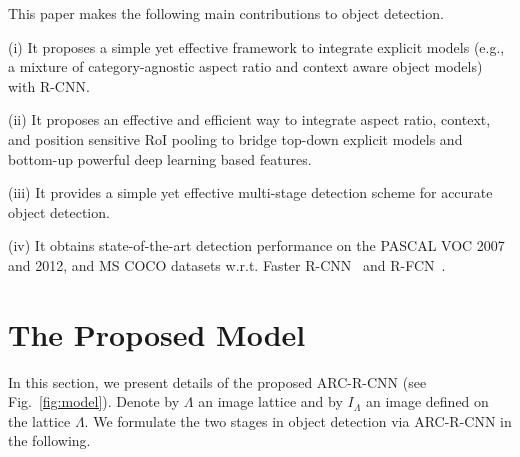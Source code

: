 \documentclass[10pt,twocolumn,letterpaper]{article}
\begin{document}
This paper makes the following main contributions to object detection. 

\iffalse{
For simplicity, we model objects with different shapes by aspect ratios as similar to \cite{DPM}. Our method effectively relieved the warping artifacts in R-CNN style models. 
In this paper, our goal is to integrating aspect ratios and context in the region-based model, boosting the performance while not increasing the computation burden much. 
We will investigate an effective and efficient way to integrate both local and global context.
}\fi

(i) It proposes a simple yet effective framework to integrate explicit models (e.g., a mixture of category-agnostic aspect ratio and context aware object models) with R-CNN.

(ii) It proposes an effective and efficient way to integrate aspect ratio, context, and position sensitive RoI pooling to bridge top-down explicit models and bottom-up powerful deep learning based features.

(iii) It provides a simple yet effective multi-stage detection scheme for accurate object detection.

(iv) It obtains state-of-the-art detection performance on the PASCAL VOC 2007 and 2012, and MS COCO datasets w.r.t. Faster R-CNN~\cite{faster_rcnn} and R-FCN~\cite{rfcn}.



\vspace{-2mm}
\section{The Proposed Model} \label{sec:model}
\vspace{-1mm}
In this section, we present details of the proposed ARC-R-CNN (see Fig.~\ref{fig:model}). 
Denote by $\Lambda$ an image lattice and by $I_{\Lambda}$ an image defined on the lattice $\Lambda$. We formulate the two stages in object detection via ARC-R-CNN in the following. 
\end{document}

